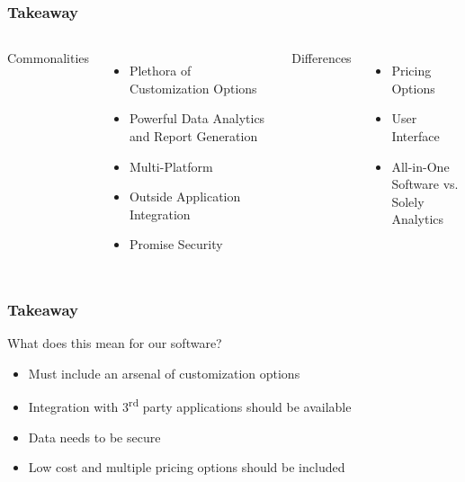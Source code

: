 \documentclass{beamer}
\begin{document}
	\begin{frame}
		\frametitle{Takeaway}
		\begin{columns}[t]
				Commonalities
				\begin{itemize}
					\item Plethora of Customization Options
					\item Powerful Data Analytics and Report Generation
					\item Multi-Platform
					\item Outside Application Integration
					\item Promise Security
				\end{itemize}
				\pause
				Differences
				\begin{itemize}
					\item Pricing Options
					\item User Interface
					\item All-in-One Software vs.\\ Solely Analytics
				\end{itemize}
		\end{columns}
	\end{frame}
	
	\begin{frame}
		\frametitle{Takeaway}
		 What does this mean for our software?
		 \begin{itemize}
		 	\item<2->\alert{Must} include an arsenal of customization options
		 	\item<3->Integration with 3\textsuperscript{rd} party applications should be available
		 	\item<4->Data needs to be secure
		 	\item<5->Low cost and multiple pricing options should be included
		 \end{itemize}
	\end{frame}
\end{document}
